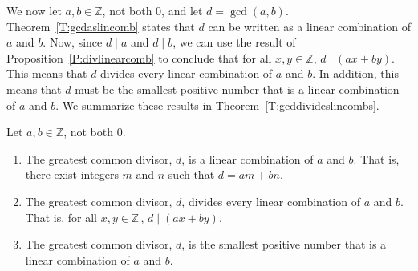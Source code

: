 We now let  $a, b \in \mathbb{Z}$, not both 0, and let  $d = \gcd( {a, b} )$.  Theorem~\ref{T:gcdaslincomb} states that  $d$  can be written as a linear combination of  $a$  and  $b$.  Now, since  $d \mid a$  and  $d \mid b$, we can use the result of Proposition~\ref{P:divlinearcomb} to conclude that for all  $x, y \in \mathbb{Z}$,  
$d \mid \left( {ax + by} \right)$.  This means that  $d$  divides every linear combination of  $a$  and  $b$.  In addition, this means that $d$ must be the smallest positive number that is a linear combination of $a$ and $b$.  We summarize these results in Theorem~\ref{T:gcddivideslincombs}.

\begin{theorem} \label{T:gcddivideslincombs}
Let  $a, b \in \mathbb{Z}$, not both 0.  %
\begin{enumerate}
\item The greatest common divisor,  $d$, is a linear combination of  $a$  and  $b$.  That is, there exist integers  $m$  and  $n$  such that  $d = am + bn$.

\item The greatest common divisor,  $d$,  divides every linear combination of  $a$  and  $b$.  That is, for all  $x, y \in \mathbb{Z}$\,,  $d \mid \left( {ax + by} \right)$.

\item The greatest common divisor, $d$, is the smallest positive number that is a linear combination of $a$ and $b$.
\end{enumerate}
\end{theorem}
%

\endinput
